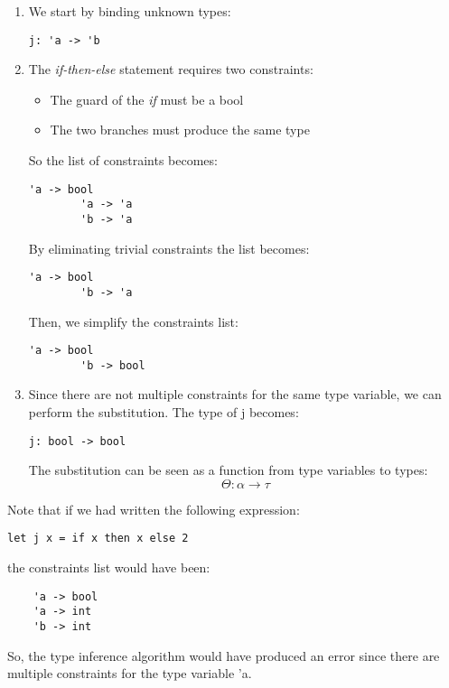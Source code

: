 \begin{enumerate}
    \item We start by binding unknown types:
    \begin{lstlisting}[style=FSharpStyle]
        j: 'a -> 'b
    \end{lstlisting}
    \item The \textit{if-then-else} statement requires two constraints:
        \begin{itemize}
            \item The guard of the \textit{if} must be a bool
            \item The two branches must produce the same type
        \end{itemize}
    So the list of constraints becomes:
    \begin{lstlisting}[style=FSharpStyle]
        'a -> bool
        'a -> 'a
        'b -> 'a
    \end{lstlisting}
    By eliminating trivial constraints the list becomes:
    \begin{lstlisting}[style=FSharpStyle]
        'a -> bool
        'b -> 'a
    \end{lstlisting}
    Then, we simplify the constraints list:
    \begin{lstlisting}[style=FSharpStyle]
        'a -> bool
        'b -> bool
    \end{lstlisting}
    \item Since there are not multiple constraints for the same type variable, we can perform the substitution. The type of j becomes:
    \begin{lstlisting}[style=FSharpStyle]
        j: bool -> bool
    \end{lstlisting}
    The substitution can be seen as a function from type variables to types:
    \[ \Theta: \alpha \rightarrow \tau\]
\end{enumerate}
Note that if we had written the following expression:
\begin{lstlisting}[style=FSharpStyle]
    let j x = if x then x else 2
\end{lstlisting}
the constraints list would have been:
\begin{lstlisting}
    'a -> bool
    'a -> int
    'b -> int
\end{lstlisting}
So, the type inference algorithm would have produced an error since there are multiple constraints for the type variable 'a.

